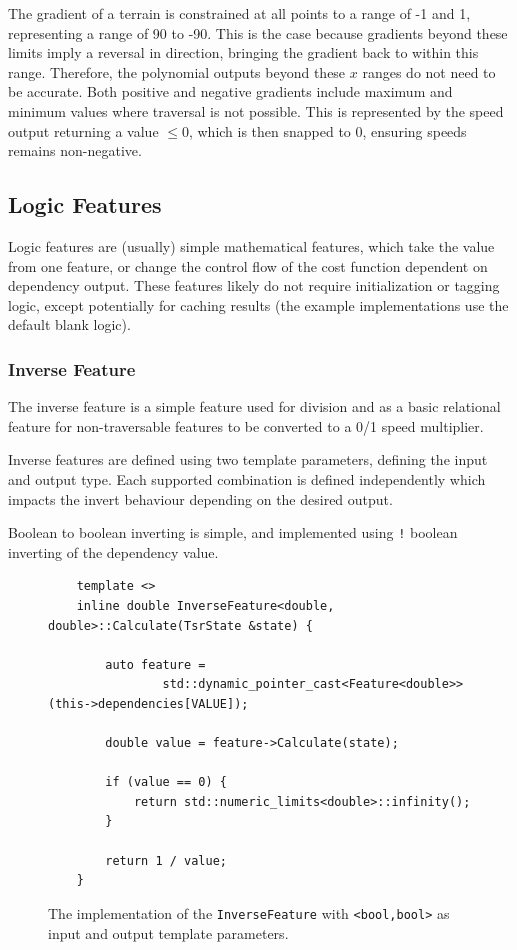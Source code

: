 \documentclass[12pt]{article}
\begin{document}
The gradient of a terrain is constrained at all points to a range of -1 and 1, representing a range of 90 to -90. This is the case because gradients beyond these limits imply a reversal in direction, bringing the gradient back to within this range. Therefore, the polynomial outputs beyond these $x$ ranges do not need to be accurate. Both positive and negative gradients include maximum and minimum values where traversal is not possible. This is represented by the speed output returning a value $\leq{0}$, which is then snapped to 0, ensuring speeds remains non-negative.

\subsection{Logic Features}

Logic features are (usually) simple mathematical features, which take the value from one feature, or change the control flow of the cost function dependent on dependency output. These features likely do not require initialization or tagging logic, except potentially for caching results (the example implementations use the default blank logic).

\subsubsection{Inverse Feature}

The inverse feature is a simple feature used for division and as a basic relational feature for non-traversable features to be converted to a 0/1 speed multiplier.

Inverse features are defined using two template parameters, defining the input and output type. Each supported combination is defined independently which impacts the invert behaviour depending on the desired output.

Boolean to boolean inverting is simple, and implemented using \texttt{!} boolean inverting of the dependency value.

\begin{figure}[H]
  \centering
  \begin{lstlisting}
	template <>
	inline double InverseFeature<double, double>::Calculate(TsrState &state) {

		auto feature =
				std::dynamic_pointer_cast<Feature<double>>(this->dependencies[VALUE]);

		double value = feature->Calculate(state);

		if (value == 0) {
			return std::numeric_limits<double>::infinity();
		}

		return 1 / value;
	}
	\end{lstlisting}
  \vspace{-2em}
  \caption{The implementation of the \texttt{InverseFeature} with \texttt{<bool,bool>} as input and output template parameters.}
  \label{lst:invert:doubledouble}
\end{figure}
\end{document}
